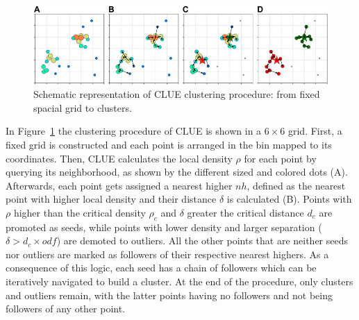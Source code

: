 \begin{figure}[tb]
    \centering
    \includegraphics[width=\textwidth]{media/clustering_procedure.jpg}
    \caption{Schematic representation of CLUE clustering procedure: from fixed spacial grid to clusters.}%
    \label{fig:clustering_procedure}
\end{figure}

In Figure~\ref{fig:clustering_procedure} the clustering procedure of CLUE is shown in a $6\times6$ grid. First, a fixed grid is constructed and each point is arranged in the bin mapped to its coordinates. Then, CLUE calculates the local density $\rho$ for each point by querying its neighborhood, as shown by the different sized and colored dots (A). Afterwards, each point gets assigned a nearest higher $nh$, defined as the nearest point with higher local density and their distance $\delta$ is calculated (B). Points with $\rho$ higher than the critical density $\rho_c$ and $\delta$ greater the critical distance $d_c$ are promoted as seeds, while points with lower density and larger separation ($\delta > d_c \times odf$) are demoted to outliers. All the other points that are neither seeds nor outliers are marked as followers of their respective nearest highers. As a consequence of this logic, each seed has a chain of followers which can be iteratively navigated to build a cluster. At the end of the procedure, only clusters and outliers remain, with the latter points having no followers and not being followers of any other point.

